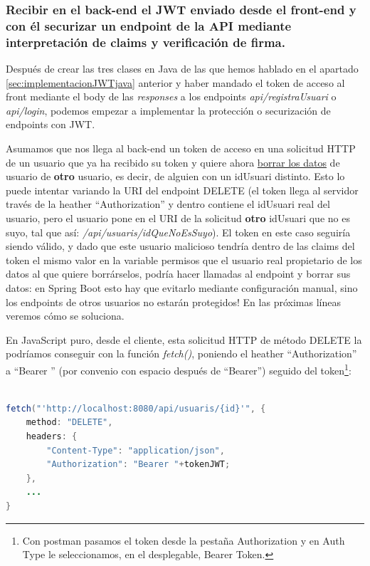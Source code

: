 \documentclass[a4paper,12pt]{report}
\begin{document}
	
		
		\subsubsection{Recibir en el back-end el JWT enviado desde el front-end y con él securizar un endpoint de la API mediante interpretación de claims y verificación de firma.}
		\label{sec:classesSecuritzacioClaimsIfirma}
		
		Después de crear las tres clases en Java de las que hemos hablado en el apartado \ref{sec:implementacionJWTjava} anterior y haber mandado el token de acceso al front mediante el body de las \textit{responses} a los endpoints \textit{api/registraUsuari} o \textit{api/login}, podemos empezar a 
		implementar la protección o securización de endpoints con JWT. 
		
		Asumamos que nos llega al back-end un token de acceso en una solicitud HTTP de un usuario que ya ha recibido su token y quiere ahora \underline{borrar los datos} de usuario de \textbf{otro} usuario, es decir, de alguien con un idUsuari distinto. Esto lo puede intentar variando la URI del endpoint DELETE (el token llega al servidor través de la heather ``Authorization'' y dentro contiene el idUsuari real del usuario, pero el usuario pone en el URI de la solicitud \textbf{otro} idUsuari que no es suyo, tal que así: \textit{/api/usuaris/{idQueNoEsSuyo}}). El token en este caso seguiría siendo válido, y dado que este usuario malicioso tendría dentro de las claims del token el mismo valor en la variable permisos que el usuario real propietario de los datos al que quiere borrárselos, podría hacer llamadas al endpoint y borrar sus datos: en Spring Boot esto hay que evitarlo mediante configuración manual, sino los endpoints de otros usuarios no estarán protegidos! En las próximas líneas veremos cómo se soluciona.
	
		
		En JavaScript puro, desde el cliente, esta solicitud HTTP de método DELETE la podríamos conseguir con la función \textit{fetch()}, poniendo el heather ``Authorization'' a ``Bearer '' (por convenio con espacio después de ``Bearer'') seguido del token\footnote{Con postman pasamos el token desde la pestaña Authorization y en Auth Type le seleccionamos, en el desplegable, Bearer Token.}:
		
				
\begin{lstlisting}[language=Java, basicstyle=\ttfamily\footnotesize, keywordstyle=\color{magenta}]

fetch("'http://localhost:8080/api/usuaris/{id}'", {
	method: "DELETE",
	headers: {
		"Content-Type": "application/json",
		"Authorization": "Bearer "+tokenJWT;
	},
	...
}
\end{lstlisting}
		
\end{document}
